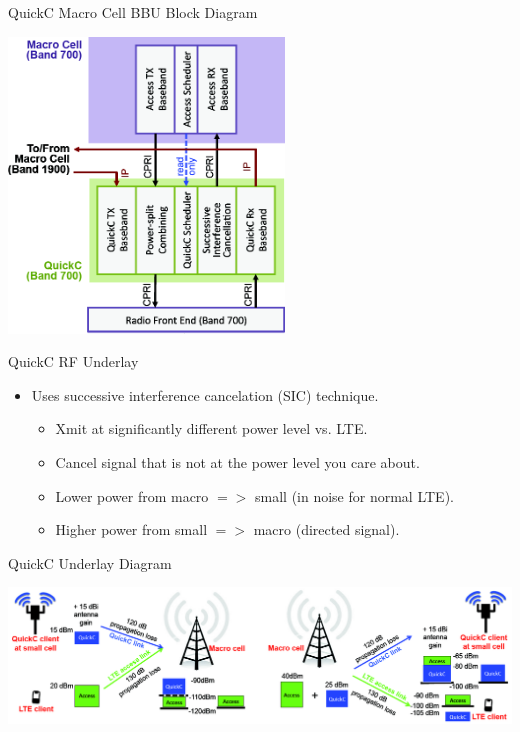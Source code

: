 \documentclass[xcolor=pdftex,dvipsnames,table]{beamer}
\begin{document}
\begin{frame}{QuickC Macro Cell BBU Block Diagram}
  \centerline{\includegraphics[width=0.55\textwidth]{./figs/quickc-macrodiagram.png}}
\end{frame}


\begin{frame}{QuickC RF Underlay}
  \begin{itemize}
  \item Uses successive interference cancelation (SIC) technique.
    \begin{itemize}
    \item Xmit at significantly different power level vs. LTE.
    \item Cancel signal that is not at the power level you care about.
    \item Lower power from macro $=>$ small (in noise for normal LTE).
    \item Higher power from small $=>$ macro (directed signal).
    \end{itemize}
  \end{itemize}
\end{frame}

\begin{frame}{QuickC Underlay Diagram}
  \centerline{\includegraphics[width=\textwidth]{./figs/quickc-underlay.png}}
\end{frame}
\end{document}
